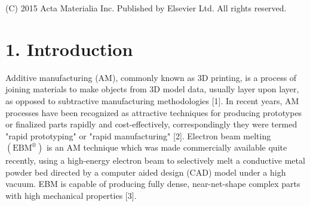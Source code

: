 \documentclass[10pt]{article}
\begin{document}
\begin{abstract}
A B S T R A C T Electron beam melting $\left(\mathrm{EBM}^{\circledR}\right)$-built Ti-6Al-4V has increasingly shown great potential for orthopedic implant and aerospace applications in recent years. The microstructure and mechanical properties of EBM-built Ti-6Al-4V have been systematically investigated in this work. Its microstructure consists of columnar prior $\beta$ grains delineated by wavy grain boundary $\alpha$ and transformed $\alpha / \beta$ structures with both cellular colony and basket-weave morphology as well as numerous singular $\alpha$ bulges within the prior $\beta$ grains. The $\beta$ phase is found to form as discrete flat rods embedded in continuous $\alpha$ phase and its volume fraction is determined to be $\sim 3.6 \%$. Moreover, $\alpha^{\prime}$ martensite was not observed as it has decomposed into $\alpha$ and $\beta$ phases. In particular, the $\alpha / \beta$ interface was studied in detail combined transmission electron microscopy with atom probe tomography. Of note is that graded Ti-6Al-4V microstructure i.e. both prior $\beta$ grain width and $\beta$ phase interspacing continuously increase with the build height, was observed, which mainly arises from the decreasing cooling rate. Furthermore, an increasingly pronounced strain hardening effect was also observed as the previously built layers undergo a longer annealing compared to the subsequent layers. As a result, graded mechanical properties of Ti-6Al-4V with degraded microhardness and tensile properties were found. A good agreement with the Hall-Petch relation indicates that the graded property takes place mainly due to the graded microstructure. In addition, this graded microstructure and mechanical properties were discussed based on a quantitative characterization.
\end{abstract}

(C) 2015 Acta Materialia Inc. Published by Elsevier Ltd. All rights reserved.

\section*{1. Introduction}
Additive manufacturing (AM), commonly known as 3D printing, is a process of joining materials to make objects from 3D model data, usually layer upon layer, as opposed to subtractive manufacturing methodologies [1]. In recent years, AM processes have been recognized as attractive techniques for producing prototypes or finalized parts rapidly and cost-effectively, correspondingly they were termed "rapid prototyping" or "rapid manufacturing" [2]. Electron beam melting $\left(\mathrm{EBM}^{\circledR}\right)$ is an AM technique which was made commercially available quite recently, using a high-energy electron beam to selectively melt a conductive metal powder bed directed by a computer aided design (CAD) model under a high vacuum. EBM is capable of producing fully dense, near-net-shape complex parts with high mechanical properties [3].
\end{document}
